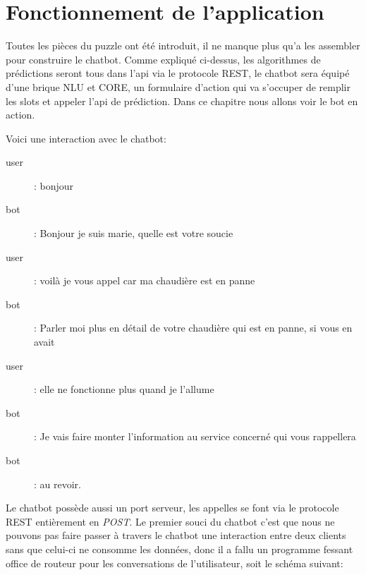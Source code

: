 
\chapter{Fonctionnement de l'application}
Toutes les pièces du puzzle ont été introduit, il ne manque plus qu'a les assembler pour construire le chatbot. Comme expliqué ci-dessus, les algorithmes de prédictions seront tous dans l'api via le protocole REST, le chatbot sera équipé d'une brique NLU et CORE, un formulaire d'action qui va s'occuper de remplir les slots et appeler l'api de prédiction.\linebreak
Dans ce chapitre nous allons voir le bot en action.

Voici une interaction avec le chatbot:

\begin{description}
\item[user]: bonjour
\item[bot]: Bonjour je suis marie, quelle est votre soucie
\item[user]: voilà je vous appel car ma chaudière est en panne
\item[bot]: Parler moi plus en détail de votre chaudière qui est en panne, si vous en avait
\item[user]: elle ne fonctionne plus quand je l'allume
\item[bot]: Je vais faire monter l'information au service concerné qui vous rappellera
\item[bot]: au revoir.	
\end{description}

Le chatbot possède aussi un port serveur, les appelles se font via le protocole REST entièrement en \textit{POST}.\linebreak
Le premier souci du chatbot c'est que nous ne pouvons pas faire passer à travers le chatbot une interaction entre deux clients sans que celui-ci ne consomme les données, donc il a fallu un programme fessant office de routeur pour les conversations de l'utilisateur, soit le schéma suivant:


